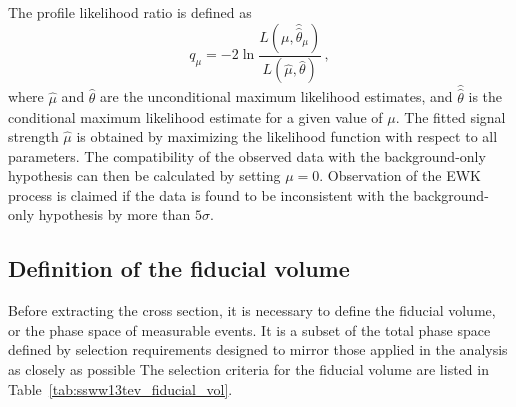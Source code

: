 The profile likelihood ratio is defined as
\begin{equation}
  q_{\mu} = -2\ln\frac{L(\mu,\hat{\hat{\theta}}_{\mu})}{L(\hat{\mu},\hat{\theta})}\,,
  \label{dq:ssww13tev_xsec_test_statistic}
\end{equation}
where $\hat{\mu}$ and $\hat{\theta}$ are the unconditional maximum likelihood estimates, and $\hat{\hat{\theta}}$ is the conditional maximum likelihood estimate for a given value of $\mu$.
The fitted signal strength $\hat{\mu}$ is obtained by maximizing the likelihood function with respect to all parameters.
The compatibility of the observed data with the background-only hypothesis can then be calculated by setting $\mu=0$.
Observation of the \ssww EWK process is claimed if the data is found to be inconsistent with the background-only hypothesis by more than $5\sigma$.


\subsection{Definition of the fiducial volume}\label{ssww13tev:xsec_fid_vol}
Before extracting the cross section, it is necessary to define the fiducial volume, or the phase space of measurable events.
It is a subset of the total phase space defined by selection requirements designed to mirror those applied in the analysis as closely as possible
The selection criteria for the fiducial volume are listed in Table~\ref{tab:ssww13tev_fiducial_vol}.

